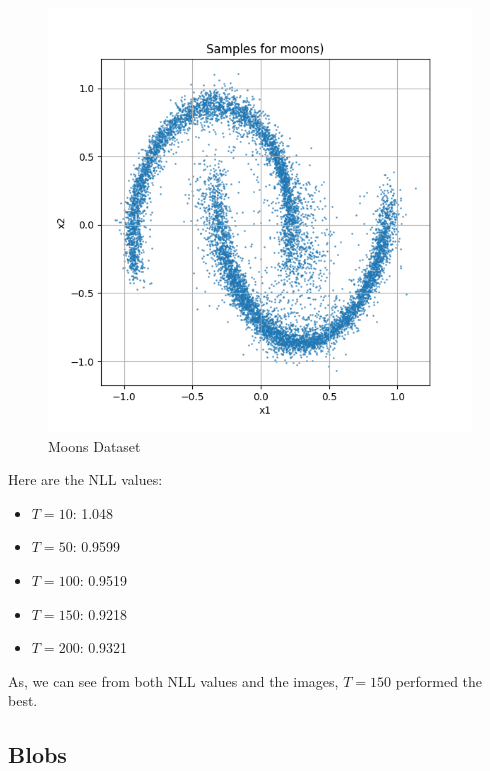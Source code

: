 \documentclass[a4paper,12pt]{article}
\begin{document}
\begin{figure}[h]
\begin{minipage}{0.3\textwidth}
  \end{minipage}
  \begin{minipage}{0.3\textwidth}
      \centering
      \includegraphics[width=\linewidth]{"images/Samples for ddpm_2_200_0.0001_0.02_moons.png"}
  \end{minipage}

  \caption{Moons Dataset}
\end{figure}

Here are the NLL values:
\begin{itemize}
  \item $T = 10$: 1.048
  \item $T = 50$: 0.9599
  \item $T = 100$: 0.9519
  \item $T = 150$: 0.9218
  \item $T = 200$: 0.9321
\end{itemize}

As, we can see from both NLL values and the images, $T = 150$ performed the best.

\clearpage



\subsection*{Blobs}
\end{document}
